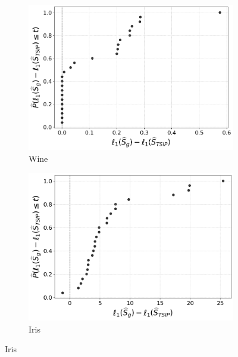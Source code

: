 \begin{figure}[t]
   \centering
    \begin{subfigure}[b]{0.45\textwidth}
        \centering
        \includegraphics[width=\textwidth]{../figures/wine_standardized_isometry_losses_ecdf}
        \caption{Wine}
        \label{fig:wine_isometry_losses}
    \end{subfigure}
    \hfill
    \begin{subfigure}[b]{0.45\textwidth}
        \centering
        \includegraphics[width=\textwidth]{../figures/iris_standardized_isometry_losses_ecdf}
        \caption{Iris}
        \label{fig:iris_isometry_losses}
    \end{subfigure}

    \vspace{1em}


\end{figure}
